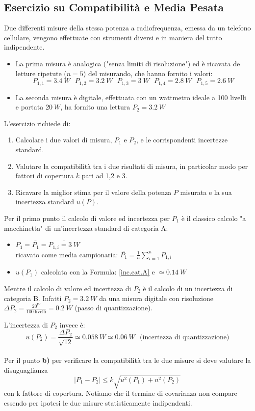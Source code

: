 \documentclass[a4paper,11pt]{report}
\begin{document}
\subsection{Esercizio su Compatibilità e Media Pesata}
Due differenti misure della stessa potenza a radiofrequenza, emessa da un telefono cellulare, vengono effettuate con strumenti diversi e in maniera del tutto indipendente.
\begin{itemize}
  \item La prima misura è analogica ("senza limiti di risoluzione") ed è ricavata de letture ripetute ($n=5$) del misurando, che hanno fornito i valori:
  $$
    P_{1,1} = 3.4~W~~~P_{1,2} = 3.2~W~~~P_{1,3} = 3~W~~~P_{1,4} = 2.8~W~~~P_{1,5} = 2.6~W 
  $$
  \item La seconda misura è digitale, effettuata con un wattmetro ideale a 100 livelli e portata $20~W$, ha fornito una lettura $P_2 = 3.2~W$
\end{itemize}
L'esercizio richiede di:
\begin{enumerate}
  \item Calcolare i due valori di misura, $P_1$ e $P_2$, e le corrispondenti incertezze standard.
  \item Valutare la compatibilità tra i due risultati di misura, in particolar modo per fattori di copertura $k$ pari ad 1,2 e 3.
  \item Ricavare la miglior stima per il valore della potenza $P$ misurata e la sua incertezza standard $u(P)$.
\end{enumerate}
Per il primo punto il calcolo di valore ed incertezza per $P_1$ è il classico calcolo "a macchinetta" di un'incertezza standard di categoria A: 
\begin{itemize}
  \item $P_1 = \bar{P_1} = \bar{P_{1,i} = 3~W}$\\ricavato come media campionaria: $\bar{P_1} = \frac{1}{n}\sum^n_{i=1}P_{1,i}$
  \item $u(P_1)$ calcolata con la Formula: \ref{inc.cat.A} e $\simeq0.14~W$
\end{itemize}
Mentre il calcolo di valore ed incertezza di $P_2$ è il calcolo di un incertezza di categoria B. Infatti $P_2 = 3.2~W$ da una misura digitale con risoluzione $\Delta P_2 = \frac{20^W}{100~\text{livelli}} = 0.2~W$ (passo di quantizzazione).

L'incertezza di $P_2$ invece è:
$$
  u(P_2) = \frac{\Delta P_2}{\sqrt{12}} \simeq 0.058~W \simeq 0.06~W\text{~~(incertezza di quantizzazione)}
$$
\\
Per il punto \textbf{b)} per verificare la compatibilità tra le due misure si deve valutare la disuguaglianza
$$
  |P_1 - P_2| \le k \sqrt{u^2(P_1)+u^2(P_2)}
$$
con k fattore di copertura. Notiamo che il termine di covarianza non compare essendo per ipotesi le due misure statisticamente indipendenti.
\end{document}
